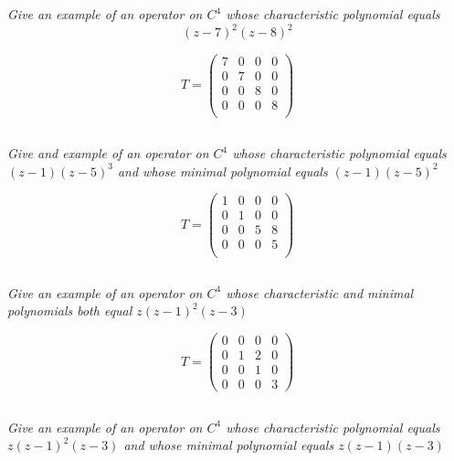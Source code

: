 \documentclass[11pt,oneside,titlepage]{book}
\begin{document}
\subsection{}

\textit{Give an example of an operator on $C^4$ whose characteristic polynomial
  equals
  $$(z - 7)^2(z - 8)^2$$}

$$
T =
\begin{pmatrix}
  7 & 0 & 0 &  0 \\
  0 & 7 & 0 & 0  \\
  0 & 0 & 8 & 0  \\
  0 & 0 & 0 & 8  \\
\end{pmatrix}
$$

\subsection{}

\textit{Give and example of an operator on $C^4$ whose characteristic polynomial
  equals $(z - 1)(z - 5)^3$ and whose minimal polynomial equals $(z - 1)(z - 5)^2$}

$$
T =
\begin{pmatrix}
  1 & 0 & 0 &  0 \\
  0 & 1 & 0 & 0  \\
  0 & 0 & 5 & 8  \\
  0 & 0 & 0 & 5  \\
\end{pmatrix}
$$

\subsection{}

\textit{Give an example of an operator on $C^4$ whose characteristic and minimal polynomials
  both equal $z(z - 1)^2(z - 3)$}

$$
T =
\begin{pmatrix}
  0 & 0 & 0 & 0 \\
  0 & 1 & 2 & 0 \\
  0 & 0 & 1 & 0 \\
  0 & 0 & 0 & 3
\end{pmatrix}
$$

\subsection{}

\textit{Give an example of an operator on $C^4$ whose characteristic polynomial
  equals $z(z -  1)^2(z - 3)$ and whose minimal polynomial equals
  $z(z -  1)(z - 3)$}
\end{document}
